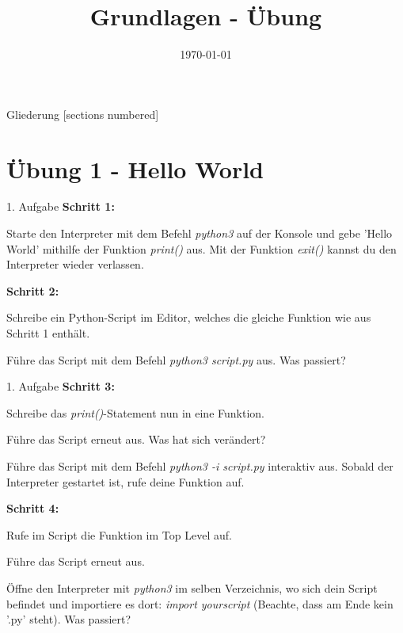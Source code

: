



\title{Grundlagen - Übung}
\date{\today}


\maketitle

\begin{frame}{Gliederung}
	[sections numbered]
	\tableofcontents
\end{frame}


\section{Übung 1 - Hello World}

\begin{frame}{1. Aufgabe}
	\textbf{Schritt 1:}
	
	Starte den Interpreter mit dem Befehl \textit{python3} auf der Konsole und gebe 'Hello World' mithilfe der Funktion \textit{print()} aus. Mit der Funktion \textit{exit()} kannst du den Interpreter wieder verlassen.
\linebreak

	\textbf{Schritt 2:}
	
	Schreibe ein Python-Script im Editor, welches die gleiche Funktion wie aus Schritt 1 enthält.
	
	Führe das Script mit dem Befehl \textit{python3 script.py} aus. Was passiert?
	
\end{frame}

\begin{frame}{1. Aufgabe}
	\textbf{Schritt 3:}
	
	Schreibe das \textit{print()}-Statement nun in eine Funktion.
	
	Führe das Script erneut aus. Was hat sich verändert?
	
	Führe das Script mit dem Befehl \textit{python3 -i script.py} interaktiv aus. Sobald der Interpreter gestartet ist, rufe deine Funktion auf. 
\linebreak

	\textbf{Schritt 4:}
	
	Rufe im Script die Funktion im Top Level auf.
	
	Führe das Script erneut aus.
	
	Öffne den Interpreter mit \textit{python3} im selben Verzeichnis, wo sich dein Script befindet und importiere es dort: \textit{import yourscript} (Beachte, dass am Ende kein ’.py’ steht). Was passiert?
	
\end{frame}

